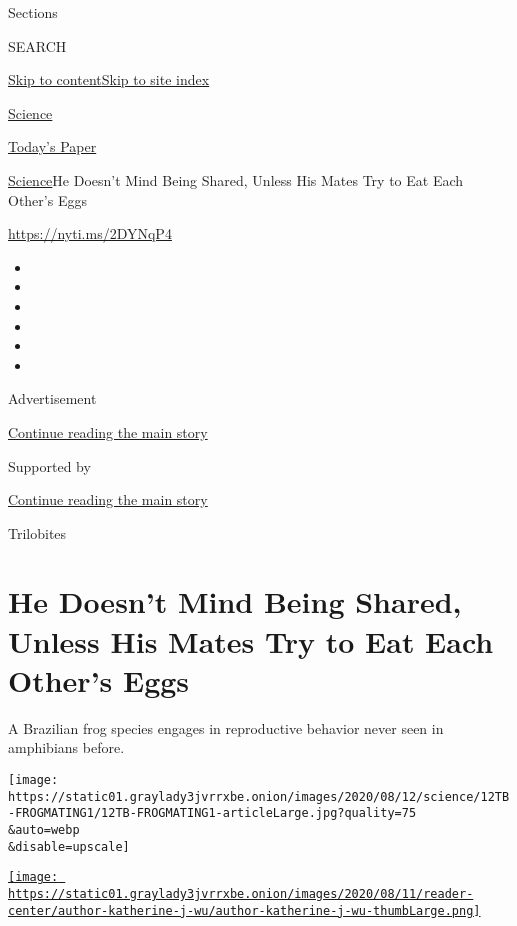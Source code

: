 Sections

SEARCH

\protect\hyperlink{site-content}{Skip to
content}\protect\hyperlink{site-index}{Skip to site index}

\href{https://www.nytimes3xbfgragh.onion/section/science}{Science}

\href{https://myaccount.nytimes3xbfgragh.onion/auth/login?response_type=cookie\&client_id=vi}{}

\href{https://www.nytimes3xbfgragh.onion/section/todayspaper}{Today's
Paper}

\href{/section/science}{Science}\textbar{}He Doesn't Mind Being Shared,
Unless His Mates Try to Eat Each Other's Eggs

\url{https://nyti.ms/2DYNqP4}

\begin{itemize}
\item
\item
\item
\item
\item
\item
\end{itemize}

Advertisement

\protect\hyperlink{after-top}{Continue reading the main story}

Supported by

\protect\hyperlink{after-sponsor}{Continue reading the main story}

Trilobites

\hypertarget{he-doesnt-mind-being-shared-unless-his-mates-try-to-eat-each-others-eggs}{%
\section{He Doesn't Mind Being Shared, Unless His Mates Try to Eat Each
Other's
Eggs}\label{he-doesnt-mind-being-shared-unless-his-mates-try-to-eat-each-others-eggs}}

A Brazilian frog species engages in reproductive behavior never seen in
amphibians before.

\texttt{[image: https://static01.graylady3jvrrxbe.onion/images/2020/08/12/science/12TB-FROGMATING1/12TB-FROGMATING1-articleLarge.jpg?quality=75\\\&auto=webp\\\&disable=upscale]}

\href{https://www.nytimes3xbfgragh.onion/by/katherine-j--wu}{\texttt{[image: https://static01.graylady3jvrrxbe.onion/images/2020/08/11/reader-center/author-katherine-j-wu/author-katherine-j-wu-thumbLarge.png]}}

